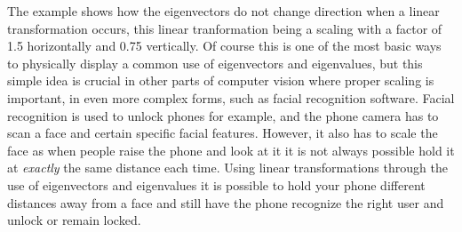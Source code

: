 \documentclass{article}
\newcommand\tab[1][1cm]{\hspace*{#1}}
\begin{document}
	\tab The example shows how the eigenvectors do not change direction when a linear
	transformation occurs, this linear tranformation being a scaling with a factor of 1.5
	horizontally and 0.75 vertically.  
	Of course this is one of the most basic ways to physically display a common use of eigenvectors and eigenvalues, but this simple idea is crucial in other parts of
	computer vision where proper scaling is important, in even more complex forms, such as facial
	recognition software. Facial recognition is used to unlock phones for example, and the phone
	camera has to scan a face and certain specific facial features. However, it also has to scale
	the face as when people raise the phone and look at it it is not always possible hold it at
	\textit{exactly} the same distance each time. Using linear transformations through the use of
	eigenvectors and eigenvalues it is possible to hold your phone different distances away from
	a face and still have the phone recognize the right user and unlock or remain locked. 
	

	
\end{document}
